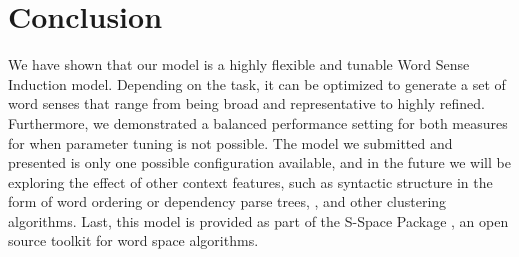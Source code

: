 \documentclass[11pt,a4]{article}
\begin{document}
\section{Conclusion}

We have shown that our model is a highly flexible and tunable Word Sense
Induction model.  Depending on the task, it can be optimized to generate a set
of word senses that range from being broad and representative to highly
refined.
Furthermore, we demonstrated a balanced performance setting for both measures for
when parameter tuning is not possible.
The model we submitted and presented is only one possible configuration
available, and in the future we will be exploring the effect of other context
features, such as syntactic structure in the form of word ordering
\cite{sahlgren08permutations} or dependency parse trees, %
\cite{pado07dependency}, and other clustering algorithms.  Last, this model is
provided as part of the S-Space Package \cite{jurgens10sspace}, an open 
source toolkit for word space algorithms.




\end{document}
